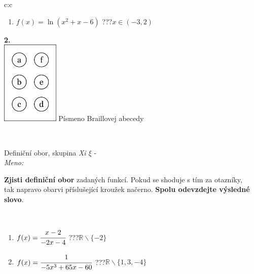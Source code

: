 \documentclass[10pt]{report}
\begin{document}
\begin{tabular}{c:c}
\begin{minipage}[c][104.5mm][t]{0.5\linewidth}
\begin{center}
\begin{minipage}{0.79\linewidth}
\begin{center}
\begin{varwidth}{\linewidth}
\begin{enumerate}
\item $f(x)=\ln{(x^2+x-6)}$\quad \dotfill\; ???\;\dotfill \quad $x\in(-3 , 2)$
\end{enumerate}
\end{varwidth}
\end{center}
\end{minipage}
\begin{minipage}{0.20\linewidth}
\begin{center}
{\Huge\bfseries 2.} \\[2mm]
\includegraphics[height=40mm]{../images/braille.png}
{\small Písmeno Braillovej abecedy}
\end{center}
\end{minipage}
\end{center}
\end{minipage}
\\ \hdashline
\begin{minipage}[c][104.5mm][t]{0.5\linewidth}
\begin{center}
\vspace{7mm}
{\huge Definiční obor, skupina \textit{Xi $\xi$} -}\\[5mm]
\textit{Meno:}\phantom{xxxxxxxxxxxxxxxxxxxxxxxxxxxxxxxxxxxxxxxxxxxxxxxxxxxxxxxxxxxxxxxxx}\\[5mm]
\begin{minipage}{0.95\linewidth}
\textbf{Zjisti definiční obor} zadaných funkcí. Pokud se shoduje s tím za otazníky,\\tak napravo obarvi příslušející kroužek načerno. \textbf{Spolu odevzdejte výsledné slovo}.
\end{minipage}
\\[1mm]
\begin{minipage}{0.79\linewidth}
\begin{center}
\begin{varwidth}{\linewidth}
\begin{enumerate}
\normalsizerrr
\item $f(x)=\cfrac{x-2}{-2x-4}$\quad \dotfill\; ???\;\dotfill \quad $\mathbb{R}\smallsetminus\{-2\}$
\item $f(x)=\cfrac{1}{-5x^3+65x-60}$\quad \dotfill\; ???\;\dotfill \quad $\mathbb{R}\smallsetminus\{1,3,-4\}$

\end{enumerate}
\end{varwidth}
\end{center}
\end{minipage}
\end{center}
\end{minipage}
\end{tabular}
\end{document}
